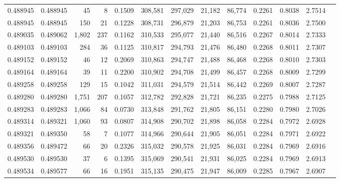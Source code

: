 \begin{tabular}{rrrrrrrrrrrrr}
0.488945 & 0.488945 &    45 &     8 &                                     0.1509 & 308,581 & 297,029 &  21,182 &  86,774 & 0.2261 & 0.8038 & 2.7514 \\
0.488945 & 0.488945 &   150 &    21 &                                     0.1228 & 308,731 & 296,879 &  21,203 &  86,753 & 0.2261 & 0.8036 & 2.7500 \\
0.489035 & 0.489062 & 1,802 &   237 &                                     0.1162 & 310,533 & 295,077 &  21,440 &  86,516 & 0.2267 & 0.8014 & 2.7333 \\
0.489103 & 0.489103 &   284 &    36 &                                     0.1125 & 310,817 & 294,793 &  21,476 &  86,480 & 0.2268 & 0.8011 & 2.7307 \\
0.489152 & 0.489152 &    46 &    12 &                                     0.2069 & 310,863 & 294,747 &  21,488 &  86,468 & 0.2268 & 0.8010 & 2.7303 \\
0.489164 & 0.489164 &    39 &    11 &                                     0.2200 & 310,902 & 294,708 &  21,499 &  86,457 & 0.2268 & 0.8009 & 2.7299 \\
0.489258 & 0.489258 &   129 &    15 &                                     0.1042 & 311,031 & 294,579 &  21,514 &  86,442 & 0.2269 & 0.8007 & 2.7287 \\
0.489280 & 0.489280 & 1,751 &   207 &                                     0.1057 & 312,782 & 292,828 &  21,721 &  86,235 & 0.2275 & 0.7988 & 2.7125 \\
0.489283 & 0.489283 & 1,066 &    84 &                                     0.0730 & 313,848 & 291,762 &  21,805 &  86,151 & 0.2280 & 0.7980 & 2.7026 \\
0.489314 & 0.489321 & 1,060 &    93 &                                     0.0807 & 314,908 & 290,702 &  21,898 &  86,058 & 0.2284 & 0.7972 & 2.6928 \\
0.489321 & 0.489350 &    58 &     7 &                                     0.1077 & 314,966 & 290,644 &  21,905 &  86,051 & 0.2284 & 0.7971 & 2.6922 \\
0.489356 & 0.489472 &    66 &    20 &                                     0.2326 & 315,032 & 290,578 &  21,925 &  86,031 & 0.2284 & 0.7969 & 2.6916 \\
0.489530 & 0.489530 &    37 &     6 &                                     0.1395 & 315,069 & 290,541 &  21,931 &  86,025 & 0.2284 & 0.7969 & 2.6913 \\
0.489534 & 0.489577 &    66 &    16 &                                     0.1951 & 315,135 & 290,475 &  21,947 &  86,009 & 0.2285 & 0.7967 & 2.6907 \\

\end{tabular}

